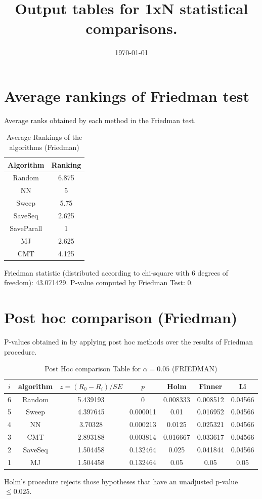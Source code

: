 \documentclass[a4paper,10pt]{article}
\title{Output tables for 1xN statistical comparisons.}
\author{}
\date{\today}
\begin{document}
\begin{landscape}
\pagestyle{empty}
\maketitle
\thispagestyle{empty}

\section{Average rankings of Friedman test}


Average ranks obtained by each method in the Friedman test.

\begin{table}[!htp]
\centering
\begin{tabular}{|c|c|}\hline
Algorithm&Ranking\\\hline
Random&6.875\\NN&5\\Sweep&5.75\\SaveSeq&2.625\\SaveParall&1\\MJ&2.625\\CMT&4.125\\\hline\end{tabular}
\caption{Average Rankings of the algorithms (Friedman)}
\end{table}

Friedman statistic (distributed according to chi-square with 6 degrees of freedom): 43.071429. \newline P-value computed by Friedman Test: 0.\newline


\newpage

\section{Post hoc comparison (Friedman)}


P-values obtained in by applying post hoc methods over the results of Friedman procedure.

\begin{table}[!htp]
\centering\footnotesize
\begin{tabular}{ccccccc}
$i$&algorithm&$z=(R_0 - R_i)/SE$&$p$&Holm &Finner&Li\\
\hline6&Random&5.439193&0&0.008333&0.008512&0.04566\\5&Sweep&4.397645&0.000011&0.01&0.016952&0.04566\\4&NN&3.70328&0.000213&0.0125&0.025321&0.04566\\3&CMT&2.893188&0.003814&0.016667&0.033617&0.04566\\2&SaveSeq&1.504458&0.132464&0.025&0.041844&0.04566\\1&MJ&1.504458&0.132464&0.05&0.05&0.05\\\hline
\end{tabular}
\caption{Post Hoc comparison Table for $\alpha=0.05$ (FRIEDMAN)}
\end{table}Holm's procedure rejects those hypotheses that have an unadjusted p-value $\le0.025$.


\end{landscape}
\end{document}
